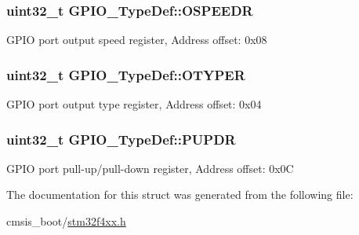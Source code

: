 \subsubsection[{\texorpdfstring{O\+S\+P\+E\+E\+DR}{OSPEEDR}}]{ uint32\+\_\+t G\+P\+I\+O\+\_\+\+Type\+Def\+::\+O\+S\+P\+E\+E\+DR}\hypertarget{struct_g_p_i_o___type_def_a0d233d720f18ae2050f9131fa6faf7c6}{}\label{struct_g_p_i_o___type_def_a0d233d720f18ae2050f9131fa6faf7c6}
G\+P\+IO port output speed register, Address offset\+: 0x08 
\subsubsection[{\texorpdfstring{O\+T\+Y\+P\+ER}{OTYPER}}]{ uint32\+\_\+t G\+P\+I\+O\+\_\+\+Type\+Def\+::\+O\+T\+Y\+P\+ER}\hypertarget{struct_g_p_i_o___type_def_a910885e4d881c3a459dd11640237107f}{}\label{struct_g_p_i_o___type_def_a910885e4d881c3a459dd11640237107f}
G\+P\+IO port output type register, Address offset\+: 0x04 
\subsubsection[{\texorpdfstring{P\+U\+P\+DR}{PUPDR}}]{ uint32\+\_\+t G\+P\+I\+O\+\_\+\+Type\+Def\+::\+P\+U\+P\+DR}\hypertarget{struct_g_p_i_o___type_def_a44ada3bfbe891e2efc1e06bda4c8014e}{}\label{struct_g_p_i_o___type_def_a44ada3bfbe891e2efc1e06bda4c8014e}
G\+P\+IO port pull-\/up/pull-\/down register, Address offset\+: 0x0C 

The documentation for this struct was generated from the following file\+:\begin{DoxyCompactItemize}
\item 
cmsis\+\_\+boot/\hyperlink{stm32f4xx_8h}{stm32f4xx.\+h}\end{DoxyCompactItemize}

